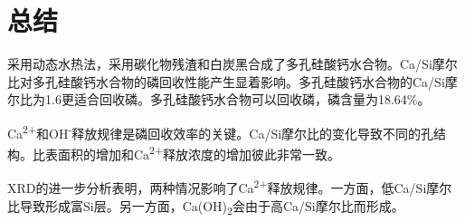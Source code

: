 \documentclass[11pt]{article}
\begin{document}
\section{总结}
\label{sec:orgc15e583}
\setlength{\parindent}{1.0cm}
采用动态水热法，采用碳化物残渣和白炭黑合成了多孔硅酸钙水合物。Ca/Si摩尔比对多孔硅酸钙水合物的磷回收性能产生显着影响。多孔硅酸钙水合物的Ca/Si摩尔比为1.6更适合回收磷。多孔硅酸钙水合物可以回收磷，磷含量为18.64\%。
\par


\setlength{\parindent}{1.0cm}
Ca\textsuperscript{2+}和OH\textsuperscript{-}释放规律是磷回收效率的关键。Ca/Si摩尔比的变化导致不同的孔结构。比表面积的增加和Ca\textsuperscript{2+}释放浓度的增加彼此非常一致。
\par


\setlength{\parindent}{1.0cm}
XRD的进一步分析表明，两种情况影响了Ca\textsuperscript{2+}释放规律。一方面，低Ca/Si摩尔比导致形成富Si层。另一方面，Ca(OH)\textsubscript{2}会由于高Ca/Si摩尔比而形成。
\par




\end{document}
